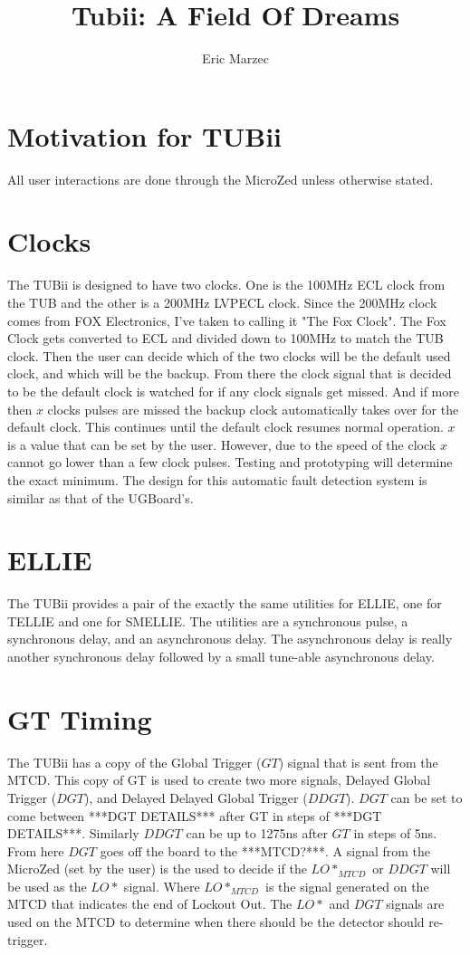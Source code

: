 \documentclass[11pt,a4paper]{article}
\author{Eric Marzec}
\title{Tubii: A Field Of Dreams}
\begin{document}
\maketitle
\section{Motivation for TUBii}
All user interactions are done through the MicroZed unless otherwise stated.
\section{Clocks}
The TUBii is designed to have two clocks. One is the 100MHz ECL clock from the TUB and the other is a 200MHz LVPECL clock. Since the 200MHz clock comes from FOX Electronics, I've taken to calling it "The Fox Clock". The Fox Clock gets converted to ECL and divided down to 100MHz to match the TUB clock. Then the user can decide which of the two clocks will be the default used clock, and which will be the backup. From there the clock signal that is decided to be the default clock is watched for if any clock signals get missed. And if more then $x$ clocks pulses are missed the backup clock automatically takes over for the default clock. This continues until the default clock resumes normal operation. $x$ is a value that can be set by the user. However, due to the speed of the clock $x$ cannot go lower than a few clock pulses. Testing and prototyping will determine the exact minimum. The design for this automatic fault detection system is similar as that of the UGBoard's.
\section{ELLIE}
The TUBii provides a pair of the exactly the same utilities for ELLIE, one for TELLIE and one for SMELLIE.
The utilities are a synchronous pulse, a synchronous delay, and an asynchronous delay.    The asynchronous delay is really another synchronous delay followed by a small tune-able asynchronous delay. 
\section{GT Timing}
The TUBii has a copy of the Global Trigger ($GT$) signal that is sent from the MTCD. This copy of GT is used to create two more signals, Delayed Global Trigger ($DGT$), and Delayed Delayed Global Trigger ($DDGT$). $DGT$ can be set to come between ***DGT DETAILS*** after GT in steps of ***DGT DETAILS***. Similarly $DDGT$ can be up to 1275ns after $GT$ in steps of 5ns. From here $DGT$ goes off the board to the ***MTCD?***. A signal from the MicroZed (set by the user) is the used to decide if the $LO*_{MTCD}$  or $DDGT$ will be used as the $LO*$ signal. Where $LO*_{MTCD}$ is the signal generated on the MTCD that indicates the end of Lockout Out. The $LO*$ and $DGT$ signals are used on the MTCD to determine when there should be the detector should re-trigger.
 
\end{document}
